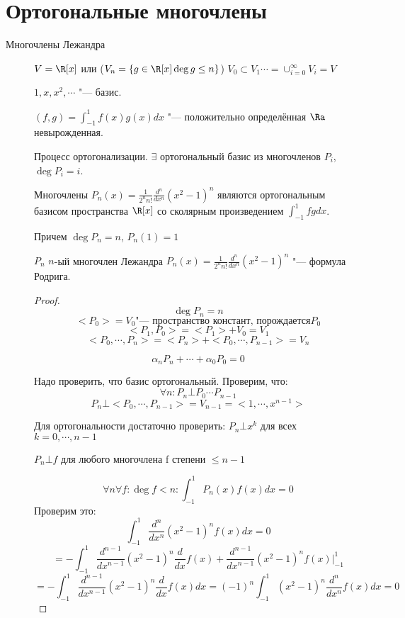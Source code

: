 ﻿\section{Ортогональные многочлены}
\begin{description}
    \item[Многочлены Лежандра]
    $V = \R[x]$ или ($V_n = \{g \in \R[x] \deg g \le n\}$)
    $V_0 \subset V_1 \cdots = \cup_{i = 0}^{\infty}V_i = V$ 

    $1,x, x^2, \cdots$ "--- базис. 

    $(f, g) = \int_{-1}^{1}f(x)g(x)dx$ "--- положительно определённая $\Ra$ невырожденная.

    Процесс ортогонализации. $\exists$ ортогональный базис из многочленов $P_i$, $\deg P_i = i$.

    \begin{theorem}{}
        Многочлены $P_n(x) = \frac{1}{2^nn!}\frac{d^n}{dx^n}(x^2 - 1)^n$
        являются ортогональным базисом пространства $\R[x]$ со сколярным произведением $\int_{-1}^{1}fgdx$.

        Причем $\deg P_n = n$, $P_n(1) = 1$
    \end{theorem}
    \begin{Def}
    $P_n$ $n$-ый многочлен Лежандра
    $P_n(x) = \frac{1}{2^nn!}\frac{d^n}{dx^n}(x^2 - 1)^n$ "--- формула Родрига. 
    \end{Def}
    \begin{proof}
    $$\deg P_n = n$$
    $$<P_0> = V_0 \text{"--- пространство констант, порождается} P_0$$
    $$<P_1, P_0> = <P_1> + V_0 = V_1$$
    $$<P_0, \cdots, P_n> = <P_n> + <P_0, \cdots, P_{n - 1}> = V_n$$

    $$\alpha_nP_n + \cdots + \alpha_0P_0 = 0$$

    Надо проверить, что базис ортогональный. 
    Проверим, что:
    $$\forall n \colon P_n \bot P_0 \cdots P_{n - 1}$$
    $$P_n \bot <P_0, \cdots, P_{n - 1}> = V_{n - 1} = <1, \cdots, x^{n - 1}> $$

    Для ортогональности достаточно проверить: $P_n \bot x^{k}$ для всех $k = 0, \cdots, n - 1$

    $P_n \bot f$ для любого многочлена f степени $\le n - 1$

    $$\forall n \forall f \colon \deg f < n \colon \int_{-1}^{1}P_{n}(x)f(x)dx = 0$$
    Проверим это:
    $$\int_{-1}^{1}\frac{d^n}{dx^n}(x^2 - 1)^n f(x)dx = 0$$
    $$ = - \int_{-1}^{1}\frac{d^{n - 1}}{dx^{n - 1}}(x^2 - 1)^n\frac{d}{dx}f(x) + \frac{d^{n - 1}}{dx^{n - 1}}(x^2 - 1)^nf(x)|_{-1}^{1} $$
    $$ = - \int_{-1}^{1}\frac{d^{n - 1}}{dx^{n - 1}}(x^2 - 1)^n\frac{d}{dx}f(x)dx = (-1)^n\int_{-1}^{1}(x^2 - 1)^n\frac{d^n}{dx^n}f(x)dx = 0$$


\end{proof}
\end{description}
